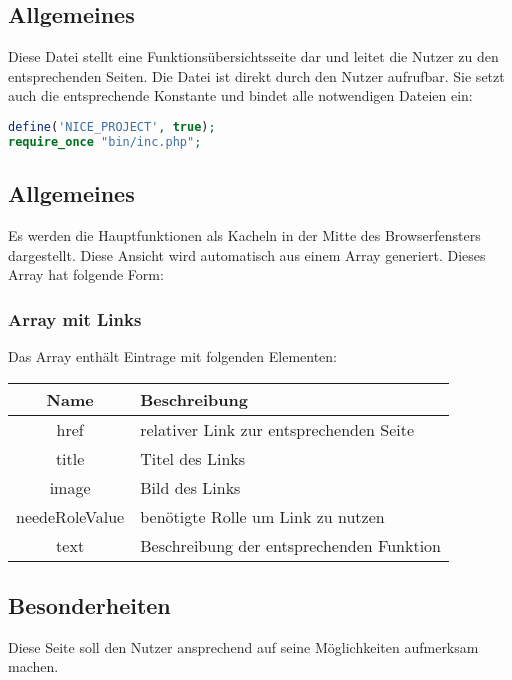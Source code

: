 \subsection{Allgemeines} Diese Datei stellt eine Funktionsübersichtsseite dar und leitet die Nutzer zu den entsprechenden Seiten.
Die Datei ist direkt durch den Nutzer aufrufbar. Sie setzt auch die entsprechende Konstante und bindet alle notwendigen Dateien ein:
\begin{lstlisting}[language=php]
define('NICE_PROJECT', true);
require_once "bin/inc.php";
\end{lstlisting}
\subsection{Allgemeines}
Es werden die Hauptfunktionen als Kacheln in der Mitte des Browserfensters dargestellt. Diese Ansicht wird automatisch aus einem Array generiert. Dieses Array hat folgende Form:
\subsubsection{Array mit Links} Das Array enthält Eintrage mit folgenden Elementen:
\begin{table}[H]
	\begin{tabular}{|c|p{11cm}|}
		\hline
		\textbf{Name} & \textbf{Beschreibung} \\ \hline
		href           & relativer Link zur entsprechenden Seite \\ \hline
		title          & Titel des Links \\ \hline
		image          & Bild des Links \\ \hline
		needeRoleValue & benötigte Rolle um Link zu nutzen \\ \hline
		text           & Beschreibung der entsprechenden Funktion \\ \hline
	\end{tabular}
\end{table}
\subsection{Besonderheiten}
Diese Seite soll den Nutzer ansprechend auf seine Möglichkeiten aufmerksam machen.
